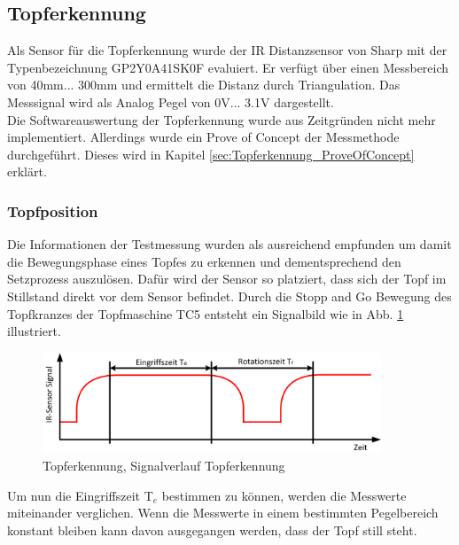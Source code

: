\subsection{Topferkennung} \label{sec:Topferkennung}
Als Sensor für die Topferkennung wurde der IR Distanzsensor von Sharp mit der Typenbezeichnung GP2Y0A41SK0F evaluiert. Er verfügt über einen Messbereich von 40mm... 300mm und ermittelt die Distanz durch Triangulation. Das Messsignal wird als Analog Pegel von 0V... 3.1V dargestellt.\\
Die Softwareauswertung der Topferkennung wurde aus Zeitgründen nicht mehr implementiert. Allerdings wurde ein Prove of Concept der Messmethode durchgeführt. Dieses wird in Kapitel \ref{sec:Topferkennung_ProveOfConcept} erklärt.



\subsubsection{Topfposition}
Die Informationen der Testmessung wurden als ausreichend empfunden um damit die Bewegungsphase eines Topfes zu erkennen und dementsprechend den Setzprozess auszulösen. Dafür wird der Sensor so platziert, dass sich der Topf im Stillstand direkt vor dem Sensor befindet. Durch die Stopp and Go Bewegung des Topfkranzes der Topfmaschine TC5 entsteht ein Signalbild wie in Abb. \ref{fig:Signalbild_Topferkennung} illustriert.\\

\begin{figure}[H]
	\includegraphics[width=0.9\textwidth]{Illustrationen/6-Umsetzung/Topferkennung_Messsignal.png}
	\caption{Topferkennung, Signalverlauf Topferkennung}
	\label{fig:Signalbild_Topferkennung}
\end{figure}

Um nun die Eingriffszeit T$_{e}$ bestimmen zu können, werden die Messwerte miteinander verglichen. Wenn die Messwerte in einem bestimmten Pegelbereich konstant bleiben kann davon ausgegangen werden, dass der Topf still steht.


